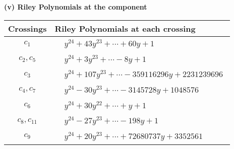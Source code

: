 \documentclass[1p]{elsarticle_modified}
\theoremstyle{definition}
\begin{document}
\newpage\renewcommand{\arraystretch}{1}
\flushleft \textbf{(v) Riley Polynomials at the component}\newline \\
\begin{tabular}{m{50pt}|m{274pt}}
Crossings & \hspace{64pt}Riley Polynomials at each crossing \\
\hline $$\begin{aligned}c_{1}\end{aligned}$$&$\begin{aligned}
&y^{24}+43 y^{23}+\cdots+60 y+1
\end{aligned}$\\
\hline $$\begin{aligned}c_{2},c_{5}\end{aligned}$$&$\begin{aligned}
&y^{24}+3 y^{23}+\cdots-8 y+1
\end{aligned}$\\
\hline $$\begin{aligned}c_{3}\end{aligned}$$&$\begin{aligned}
&y^{24}+107 y^{23}+\cdots-359116296 y+2231239696
\end{aligned}$\\
\hline $$\begin{aligned}c_{4},c_{7}\end{aligned}$$&$\begin{aligned}
&y^{24}-30 y^{23}+\cdots-3145728 y+1048576
\end{aligned}$\\
\hline $$\begin{aligned}c_{6}\end{aligned}$$&$\begin{aligned}
&y^{24}+30 y^{22}+\cdots+y+1
\end{aligned}$\\
\hline $$\begin{aligned}c_{8},c_{11}\end{aligned}$$&$\begin{aligned}
&y^{24}-27 y^{23}+\cdots-198 y+1
\end{aligned}$\\
\hline $$\begin{aligned}c_{9}\end{aligned}$$&$\begin{aligned}
&y^{24}+20 y^{23}+\cdots+72680737 y+3352561
\end{aligned}$\\

\end{tabular}
\end{document}

